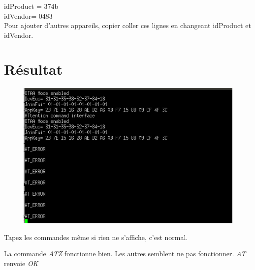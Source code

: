 \documentclass{article}
\begin{document}
idProduct = 374b\\
idVendor= 0483\\

Pour ajouter d'autres appareils, copier coller ces lignes en changeant idProduct et idVendor. \\

\section{Résultat}







\begin{figure}[H]
\begin{center}
\advance\leftskip-3cm
\advance\rightskip-3cm
\includegraphics[keepaspectratio=true,scale=0.6]{putty.png}
\label{visina8}
\end{center}\end{figure}

Tapez les commandes même si rien ne s'affiche, c'est normal.

La commande \textit{ATZ} fonctionne bien.
Les autres semblent ne pas fonctionner.
\textit{AT} renvoie \textit{OK}
\end{document}
